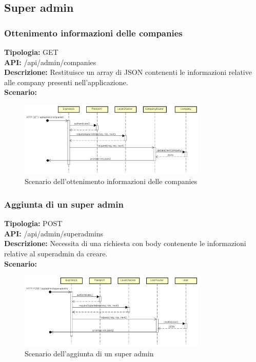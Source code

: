 \newpage
\subsection{Super admin}
\subsubsection{Ottenimento informazioni delle companies}
\textbf{Tipologia:} GET \\
\textbf{API:} /api/admin/companies \\
\textbf{Descrizione:} Restituisce un array di JSON contenenti le informazioni relative alle company presenti nell'applicazione. \\
\textbf{Scenario:} 
\begin{figure}[h]
\centering
\includegraphics[width=0.8\textwidth]{res/sections/backend/(GET)companySA.png}
\caption{Scenario dell'ottenimento informazioni delle companies}
\end{figure}

\newpage
\subsubsection{Aggiunta di un super admin}
\textbf{Tipologia:} POST \\
\textbf{API:} /api/admin/superadmins \\
\textbf{Descrizione:} Necessita di una richiesta con body contenente le informazioni relative al superadmin da creare. \\
\textbf{Scenario:} 
\begin{figure}[h]
\centering
\includegraphics[width=0.8\textwidth]{res/sections/backend/(POST)superadmin.png}
\caption{Scenario dell'aggiunta di un super admin}
\end{figure}

